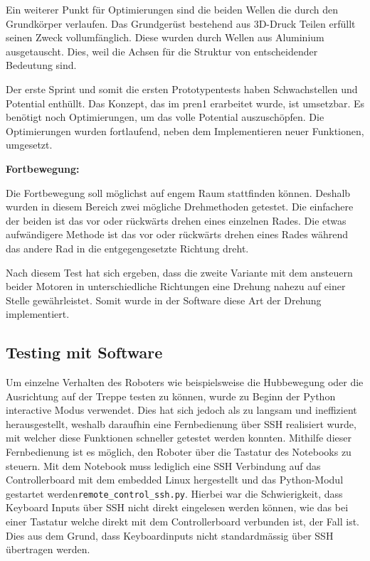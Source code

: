 Ein weiterer Punkt für Optimierungen sind die beiden Wellen die durch den Grundkörper verlaufen. Das Grundgerüst bestehend aus 3D-Druck Teilen erfüllt seinen Zweck vollumfänglich. Diese wurden durch Wellen aus Aluminium ausgetauscht. Dies, weil die Achsen für die Struktur von entscheidender Bedeutung sind. 

Der erste Sprint und somit die ersten Prototypentests haben Schwachstellen und Potential enthüllt. Das Konzept, das im \acrshort{pren1} erarbeitet wurde, ist umsetzbar. Es benötigt noch Optimierungen, um das volle Potential auszuschöpfen. Die Optimierungen wurden fortlaufend, neben dem Implementieren neuer Funktionen, umgesetzt.

\textbf{Fortbewegung:}

Die Fortbewegung soll möglichst auf engem Raum stattfinden können. Deshalb wurden in diesem Bereich zwei mögliche Drehmethoden getestet. Die einfachere der beiden ist das vor oder rückwärts drehen eines einzelnen Rades. Die etwas aufwändigere Methode ist das vor oder rückwärts drehen eines Rades während das andere Rad in die entgegengesetzte Richtung dreht.

Nach diesem Test hat sich ergeben, dass die zweite Variante mit dem ansteuern beider Motoren in unterschiedliche Richtungen eine Drehung nahezu auf einer Stelle gewährleistet. Somit wurde in der Software diese Art der Drehung implementiert.

\newpage

\subsection{Testing mit Software}\label{subsec:Fernbedienung}
Um einzelne Verhalten des Roboters wie beispielsweise die Hubbewegung oder die Ausrichtung auf der Treppe testen zu können, wurde zu Beginn der Python interactive Modus verwendet. Dies hat sich jedoch als zu langsam und ineffizient herausgestellt, weshalb daraufhin eine Fernbedienung über SSH realisiert wurde, mit welcher diese Funktionen schneller getestet werden konnten.
Mithilfe dieser Fernbedienung ist es möglich, den Roboter über die Tastatur des Notebooks zu steuern. Mit dem Notebook muss lediglich eine SSH Verbindung auf das Controllerboard mit dem embedded Linux hergestellt und das Python-Modul gestartet werden\texttt{remote\_control\_ssh.py}. Hierbei war die Schwierigkeit, dass Keyboard Inputs über SSH nicht direkt eingelesen werden können, wie das bei einer Tastatur welche direkt mit dem Controllerboard verbunden ist, der Fall ist. Dies aus dem Grund, dass Keyboardinputs nicht standardmässig über SSH übertragen werden. 

